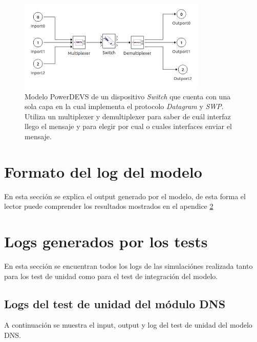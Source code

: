 \documentclass[10pt,a4paper]{article}
\begin{document}
\newpage

\begin{figure}[!htb]
    \centering
    \includegraphics[width = 0.8\textwidth]{img/png/powerdevs/switch.png}
    \caption{Modelo PowerDEVS de un dispositivo \textit{Switch} que cuenta con una sola capa en la cual implementa el protocolo \textit{Datagram} y \textit{SWP}. Utiliza un multiplexer y demultiplexer para saber de cuál interfaz llego el mensaje y para elegir por cual o cuales interfaces enviar el mensaje.}
    \label{figure: powerdevs switch}
\end{figure}




\newpage

\appendix
\section{Formato del log del modelo}
En esta sección se explica el output generado por el modelo, de esta forma el lector puede comprender los resultados mostrados en el apendice \ref{appendix: logs}



\section{Logs generados por los tests}
\label{appendix: logs}
En esta sección se encuentran todos los logs de las simulaciónes realizada tanto para los test de unidad como para el test de integración del modelo.

\subsection{Logs del test de unidad del módulo DNS}
\label{appendix: dns unit test}

A continuación se muestra el input, output y log del test de unidad del modelo DNS.\\
\end{document}
